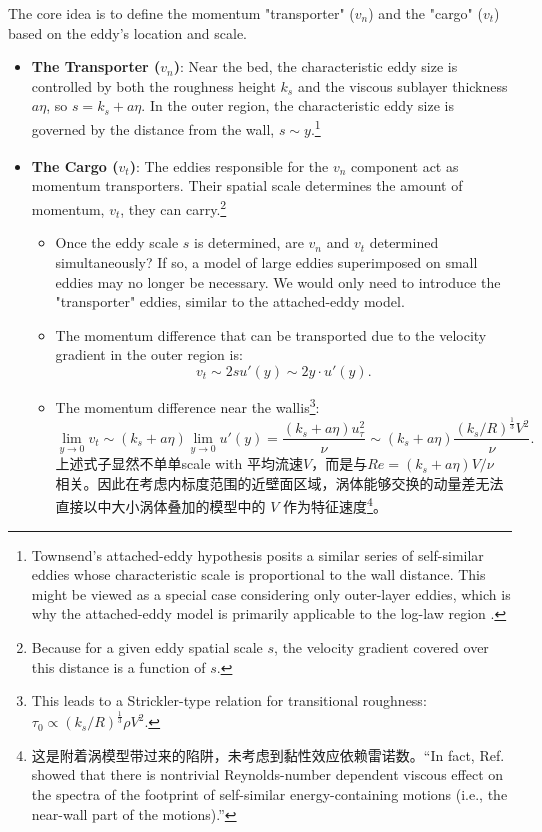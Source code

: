 \documentclass[10pt]{article}
\newcommand{\his}{\textsuperscript{\ddag}}
\begin{document}
The core idea is to define the momentum "transporter" ($v_n$) and the "cargo" ($v_t$) based on the eddy's location and scale.
\begin{itemize}
    \item \textbf{The Transporter ($v_n$)}: Near the bed, the characteristic eddy size is controlled by both the roughness height $k_s$ and the viscous sublayer thickness $a\eta$, so $s = k_s + a\eta$\ddag. In the outer region, the characteristic eddy size is governed by the distance from the wall, $s\sim y$.\footnote{Townsend's attached-eddy hypothesis posits a similar series of self-similar eddies whose characteristic scale is proportional to the wall distance. This might be viewed as a special case considering only outer-layer eddies, which is why the attached-eddy model is primarily applicable to the log-law region \cite{aemmarusic2019}.}
    
    \item \textbf{The Cargo ($v_t$)\his}: The eddies responsible for the $v_n$ component act as momentum transporters. Their spatial scale determines the amount of momentum, $v_t$, they can carry.\footnote{Because for a given eddy spatial scale $s$, the velocity gradient covered over this distance is a function of $s$.}
        \begin{itemize}
            \item Once the eddy scale $s$ is determined, are $v_n$ and $v_t$ determined simultaneously? If so, a model of large eddies superimposed on small eddies may no longer be necessary. We would only need to introduce the "transporter" eddies, similar to the attached-eddy model.
            \item The momentum difference that can be transported due to the velocity gradient in the outer region is:
            $$v_t \sim 2s u'(y) \sim 2y \cdot u'(y).$$
            \item The momentum difference near the wall\his is\footnote{This leads to a Strickler-type relation for transitional roughness: $\tau_0 \propto \left( k_s / R \right) ^{\frac{1}{3}} \rho V^2 $.}:
            $$\lim_{y \to 0} v_t \sim \left( k_s + a\eta \right) \lim_{y \to 0} u'(y) =  \frac{(k_s + a \eta)u_{\tau}^2}{\nu} \sim (k_s + a\eta) \frac{\left( k_s / R \right)^{\frac{1}{3}} V^2}{\nu}.$$
            上述式子显然不单单scale with 平均流速$V$，而是与$Re = \left( k_s + a\eta \right) V / \nu$ 相关。因此在考虑内标度范围的近壁面区域，涡体能够交换的动量差无法直接以\citet{gioiaprl2001}中大小涡体叠加的模型中的 $V$ 作为特征速度\footnote{这是附着涡模型带过来的陷阱，未考虑到黏性效应依赖雷诺数。“In fact, Ref. \citep{Hwang2016} showed that there is nontrivial Reynolds-number dependent viscous effect on the spectra of the footprint of self-similar energy-containing motions (i.e., the near-wall part of the motions).”}。
        \end{itemize}
\end{itemize}
\end{document}
